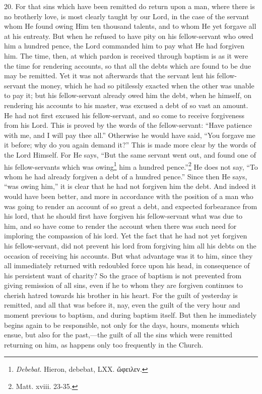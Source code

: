 20. For that sins which have been remitted do return upon a man, where there is no brotherly love, is most clearly taught by our Lord, in the case of the servant whom He found owing Him ten thousand talents, and to whom He yet forgave all at his entreaty. But when he refused to have pity on his fellow-servant who owed him a hundred pence, the Lord commanded him to pay what He had forgiven him. The time, then, at which pardon is received through baptism is as it were the time for rendering accounts, so that all the debts which are found to be due may be remitted. Yet it was not afterwards that the servant lent his fellow-servant the money, which he had so pitilessly exacted when the other was unable to pay it; but his fellow-servant already owed him the debt, when he himself, on rendering his accounts to his master, was excused a debt of so vast an amount. He had not first excused his fellow-servant, and so come to receive forgiveness from his Lord. This is proved by the words of the fellow-servant: ``Have patience with me, and I will pay thee all.'' Otherwise he would have said, ``You forgave me it before; why do you again demand it?'' This is made more clear by the words of the Lord Himself. For He says, ``But the same servant went out, and found one of his fellow-servants which was owing\footnote{\par  \emph{Debebat}. Hieron, debebat, LXX. \textgreek{ὤφειλεν}.} him a hundred pence.''\footnote{\par  Matt. xviii. 23-35.} He does not say, ``To whom he had already forgiven a debt of a hundred pence.'' Since then He says, ``was owing him,'' it is clear that he had not forgiven him the debt. And indeed it would have been better, and more in accordance with the position of a man who was going to render an account of so great a debt, and expected forbearance from his lord, that he should first have forgiven his fellow-servant what was due to him, and so have come to render the account when there was such need for imploring the compassion of his lord. Yet the fact that he had not yet forgiven his fellow-servant, did not prevent his lord from forgiving him all his debts on the occasion of receiving his accounts. But what advantage was it to him, since they all immediately returned with redoubled force upon his head, in consequence of his persistent want of charity? So the grace of baptism is not prevented from giving remission of all sins, even if he to whom they are forgiven continues to cherish hatred towards his brother in his heart. For the guilt of yesterday is remitted, and all that was before it, nay, even the guilt of the very hour and moment previous to baptism, and during baptism itself. But then he immediately begins again to be responsible, not only for the days, hours, moments which ensue, but also for the past,—the guilt of all the sins which were remitted returning on him, as happens only too frequently in the Church.

